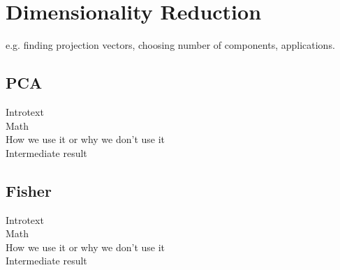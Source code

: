 \section{Dimensionality Reduction}

e.g. finding projection vectors, choosing number of components, applications.\\

\subsection{PCA}

Introtext\\

Math\\

How we use it or why we don't use it\\

Intermediate result\\


\subsection{Fisher}

Introtext\\

Math\\

How we use it or why we don't use it\\

Intermediate result\\

